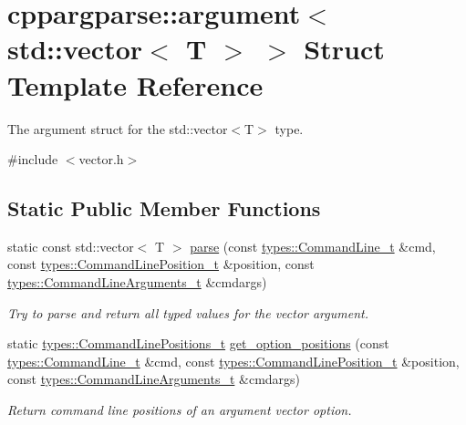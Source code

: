\hypertarget{structcppargparse_1_1argument_3_01std_1_1vector_3_01T_01_4_01_4}{}\section{cppargparse\+:\+:argument$<$ std\+:\+:vector$<$ T $>$ $>$ Struct Template Reference}
\label{structcppargparse_1_1argument_3_01std_1_1vector_3_01T_01_4_01_4}


The argument struct for the std\+::vector$<$\+T$>$ type.  




{\ttfamily \#include $<$vector.\+h$>$}

\subsection*{Static Public Member Functions}
\begin{DoxyCompactItemize}
\item 
static const std\+::vector$<$ T $>$ \hyperlink{structcppargparse_1_1argument_3_01std_1_1vector_3_01T_01_4_01_4_ada258269ddf190ae8376a6bb807de588}{parse} (const \hyperlink{types_8h_a80adf2418b7ce9fe616698efa7533ecf}{types\+::\+Command\+Line\+\_\+t} \&cmd, const \hyperlink{types_8h_a43b4f43f8940de1bf09ced6f1b668053}{types\+::\+Command\+Line\+Position\+\_\+t} \&position, const \hyperlink{types_8h_a003c660afe2ee9c6cc39aea966e8926d}{types\+::\+Command\+Line\+Arguments\+\_\+t} \&cmdargs)
\begin{DoxyCompactList}\small\item\em Try to parse and return all typed values for the vector argument. \end{DoxyCompactList}\item 
static \hyperlink{types_8h_a96efcf8a8929cc8e503e27b180627140}{types\+::\+Command\+Line\+Positions\+\_\+t} \hyperlink{structcppargparse_1_1argument_3_01std_1_1vector_3_01T_01_4_01_4_a57aaaece7f0d299010f47a9bbfbe5e70}{get\+\_\+option\+\_\+positions} (const \hyperlink{types_8h_a80adf2418b7ce9fe616698efa7533ecf}{types\+::\+Command\+Line\+\_\+t} \&cmd, const \hyperlink{types_8h_a43b4f43f8940de1bf09ced6f1b668053}{types\+::\+Command\+Line\+Position\+\_\+t} \&position, const \hyperlink{types_8h_a003c660afe2ee9c6cc39aea966e8926d}{types\+::\+Command\+Line\+Arguments\+\_\+t} \&cmdargs)
\begin{DoxyCompactList}\small\item\em Return command line positions of an argument vector option. \end{DoxyCompactList}\end{DoxyCompactItemize}


